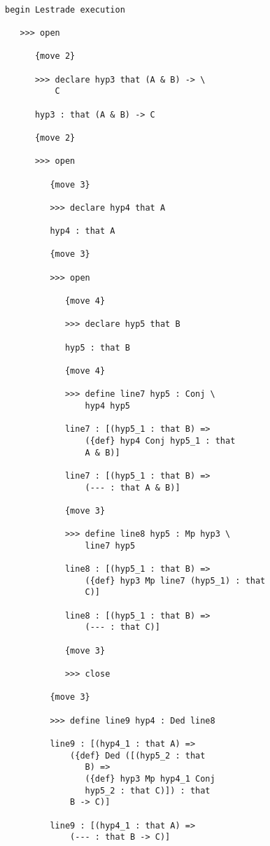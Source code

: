 \documentclass[12pt]{article}
\begin{document}
\begin{verbatim}

begin Lestrade execution

   >>> open

      {move 2}

      >>> declare hyp3 that (A & B) -> \
          C

      hyp3 : that (A & B) -> C

      {move 2}

      >>> open

         {move 3}

         >>> declare hyp4 that A

         hyp4 : that A

         {move 3}

         >>> open

            {move 4}

            >>> declare hyp5 that B

            hyp5 : that B

            {move 4}

            >>> define line7 hyp5 : Conj \
                hyp4 hyp5

            line7 : [(hyp5_1 : that B) => 
                ({def} hyp4 Conj hyp5_1 : that 
                A & B)]

            line7 : [(hyp5_1 : that B) => 
                (--- : that A & B)]

            {move 3}

            >>> define line8 hyp5 : Mp hyp3 \
                line7 hyp5

            line8 : [(hyp5_1 : that B) => 
                ({def} hyp3 Mp line7 (hyp5_1) : that 
                C)]

            line8 : [(hyp5_1 : that B) => 
                (--- : that C)]

            {move 3}

            >>> close

         {move 3}

         >>> define line9 hyp4 : Ded line8

         line9 : [(hyp4_1 : that A) => 
             ({def} Ded ([(hyp5_2 : that 
                B) => 
                ({def} hyp3 Mp hyp4_1 Conj 
                hyp5_2 : that C)]) : that 
             B -> C)]

         line9 : [(hyp4_1 : that A) => 
             (--- : that B -> C)]


\end{verbatim}
\end{document}
